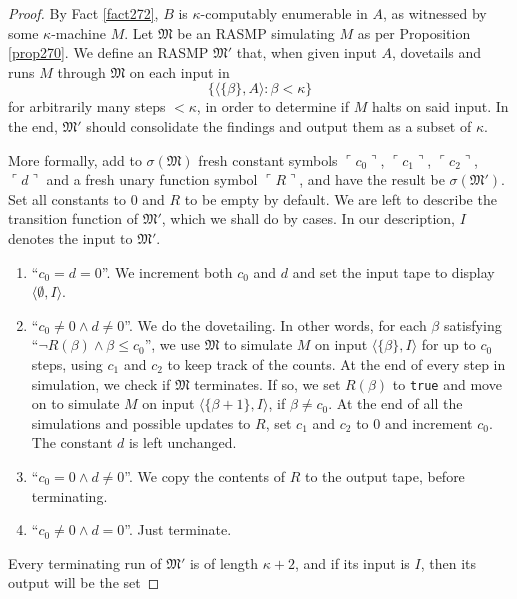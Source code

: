 \documentclass[12pt, twoside]{memoir}
\numberwithin{equation}{section}
\theoremstyle{definition}
\theoremstyle{remark}
\theoremstyle{definition}
\theoremstyle{definition}
\theoremstyle{definition}
\theoremstyle{remark}
\begin{document}
\begin{proof}
By Fact \ref{fact272}, $B$ is $\kappa$-computably enumerable in $A$, as witnessed by some $\kappa$-machine $M$. Let $\mathfrak{M}$ be an RASMP simulating $M$ as per Proposition \ref{prop270}. We define an RASMP $\mathfrak{M}'$ that, when given input $A$, dovetails and runs $M$ through $\mathfrak{M}$ on each input in
\begin{equation*}
    \{\langle \{\beta\}, A \rangle : \beta < \kappa\}
\end{equation*}
for arbitrarily many steps $< \kappa$, in order to determine if $M$ halts on said input. In the end, $\mathfrak{M}'$ should consolidate the findings and output them as a subset of $\kappa$.

More formally, add to $\sigma(\mathfrak{M})$ fresh constant symbols $\ulcorner c_0 \urcorner$, $\ulcorner c_1 \urcorner$, $\ulcorner c_2 \urcorner$, $\ulcorner d \urcorner$ and a fresh unary function symbol $\ulcorner R \urcorner$, and have the result be $\sigma(\mathfrak{M}')$. Set all constants to $0$ and $R$ to be empty by default. We are left to describe the transition function of $\mathfrak{M}'$, which we shall do by cases. In our description, $I$ denotes the input to $\mathfrak{M}'$.
\begin{enumerate}[leftmargin=60pt, label=Case \arabic*:]
    \item ``$c_0 = d = 0$''. We increment both $c_0$ and $d$ and set the input tape to display $\langle \emptyset, I \rangle$.
    \item ``$c_0 \neq 0 \wedge d \neq 0$''. We do the dovetailing. In other words, for each $\beta$ satisfying ``$\neg R(\beta) \wedge \beta \leq c_0$'', we use $\mathfrak{M}$ to simulate $M$ on input $\langle \{\beta\}, I \rangle$ for up to $c_0$ steps, using $c_1$ and $c_2$ to keep track of the counts. At the end of every step in simulation, we check if $\mathfrak{M}$ terminates. If so, we set $R(\beta)$ to \texttt{true} and move on to simulate $M$ on input $\langle \{\beta + 1\}, I \rangle$, if $\beta \neq c_0$. At the end of all the simulations and possible updates to $R$, set $c_1$ and $c_2$ to $0$ and increment $c_0$. The constant $d$ is left unchanged.
    \item ``$c_0 = 0 \wedge d \neq 0$''. We copy the contents of $R$ to the output tape, before terminating.
    \item ``$c_0 \neq 0 \wedge d = 0$''. Just terminate.
\end{enumerate}
Every terminating run of $\mathfrak{M}'$ is of length $\kappa + 2$, and if its input is $I$, then its output will be the set

\end{proof}
\end{document}
